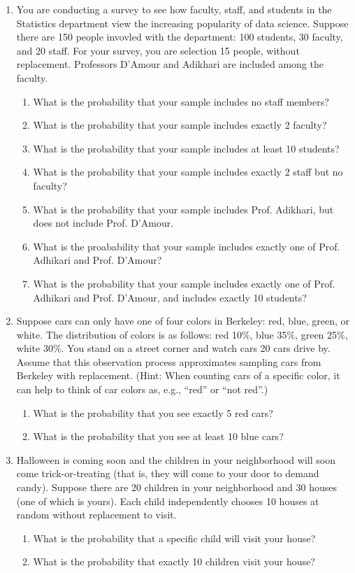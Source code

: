 \documentclass[11pt]{article}
\begin{document}
\begin{enumerate}
    \item You are conducting a survey to see how faculty, staff, and students in the Statistics department view the increasing popularity of data science. Suppose there are 150 people invovled with the department: 100 students, 30 faculty, and 20 staff. For your survey, you are selection 15 people, without replacement. Professors D'Amour and Adikhari are included among the faculty.
        \begin{enumerate}
            \item What is the probability that your sample includes no staff members?
            \item What is the probability that your sample includes exactly 2 faculty?
            \item What is the probability that your sample includes at least 10 students?
            \item What is the probability that your sample includes exactly 2 staff but no faculty?
            \item What is the probability that your sample includes Prof. Adikhari, but does not include Prof. D'Amour.
            \item What is the proabability that your sample includes exactly one of Prof. Adhikari and Prof. D'Amour?
            \item What is the probability that your sample includes exactly one of Prof. Adhikari and Prof. D'Amour, and includes exactly 10 students?
        \end{enumerate}

    \item Suppose cars can only have one of four colors in Berkeley: red, blue, green, or white. The distribution of colors is as follows: red 10\%, blue 35\%, green 25\%, white 30\%. You stand on a street corner and watch cars 20 cars drive by. Assume that this observation process approximates sampling cars from Berkeley with replacement. (Hint: When counting cars of a specific color, it can help to think of car colors as, e.g., ``red'' or ``not red''.)
        \begin{enumerate}
            \item What is the probability that you see exactly 5 red cars?
            \item What is the probability that you see at least 10 blue cars?
        \end{enumerate}

    \item Halloween is coming soon and the children in your neighborhood will soon come trick-or-treating (that is, they will come to your door to demand candy). Suppose there are 20 children in your neighborhood and 30 houses (one of which is yours). Each child independently chooses 10 houses at random without replacement to visit.
        \begin{enumerate}
            \item What is the probability that a specific child will visit your house?
            \item What is the probability that exactly 10 children visit your house?
        \end{enumerate}


\end{enumerate}
\end{document}
